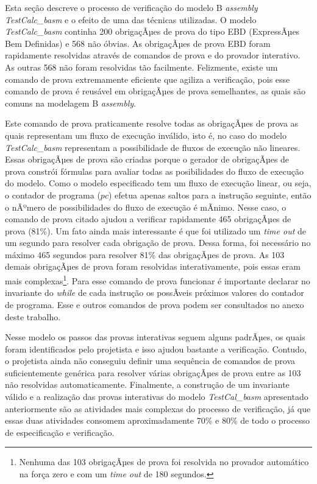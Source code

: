 \documentclass[11pt]{article} %
\begin{document}
Esta seção descreve o processo de verificação do modelo B \textit{assembly} \textit{TestCalc\_basm} e o
efeito de uma das técnicas utilizadas. O modelo \textit{TestCalc\_basm} continha 200 obrigaçÃµes de prova
do tipo EBD (ExpressÃµes Bem Definidas) e 568 não óbvias. As obrigaçÃµes de prova EBD foram rapidamente
resolvidas através de comandos de prova e do provador interativo. As outras 568 não foram resolvidas tão
facilmente. Felizmente, existe um comando de prova extremamente eficiente que agiliza a verificação, pois
esse comando de prova é reusável em obrigaçÃµes de prova semelhantes, as quais são comuns na modelagem B
\textit{assembly}.

Este comando de prova praticamente resolve todas as obrigaçÃµes de prova as quais representam um fluxo de
execução inválido, isto é, no caso do modelo \textit{TestCalc\_basm} representam a possibilidade de
fluxos de execução não lineares. Essas obrigaçÃµes de prova são criadas porque o gerador de obrigaçÃµes de prova constrói fórmulas para avaliar todas as posibilidades
do fluxo de execução do modelo. Como o modelo especificado tem um fluxo de execução linear, ou
seja, o contador de programa ($\mathit{pc}$) efetua apenas saltos para a instrução seguinte, então o nÃºmero
de possibilidades do fluxo de execução é mÃ­nimo. Nesse caso, o comando de prova citado ajudou a verificar
rapidamente 465 obrigaçÃµes de prova (81\%). Um fato ainda mais interessante é que foi utilizado um \textit{time out}
de um segundo para resolver cada obrigação de prova. Dessa forma, foi necessário no máximo 465 segundos para resolver 81\%
das obrigaçÃµes de prova. As 103 demais obrigaçÃµes de prova foram resolvidas interativamente, pois essas eram mais
complexas\footnote{Nenhuma das 103 obrigaçÃµes de prova foi resolvida no provador automático na força
zero e com um \textit{time out} de 180 segundos.}. Para esse comando de prova funcionar é
importante declarar no invariante do \textit{while} de cada instrução os possÃ­veis próximos valores do
contador de programa. Esse e outros comandos de prova podem ser consultados no anexo deste trabalho.

Nesse modelo os passos das provas interativas seguem alguns padrÃµes, os quais foram identificados pelo projetista
e isso ajudou bastante a verificação. Contudo, o projetista ainda não conseguiu definir uma sequência de comandos de prova 
suficientemente genérica para resolver várias obrigaçÃµes de prova entre as 103 não resolvidas
automaticamente. Finalmente, a construção de um invariante válido e a realização das provas interativas
do modelo \textit{TestCal\_basm} apresentado anteriormente são as atividades mais complexas do processo
de verificação, já que essas duas atividades consomem aproximadamente 70\% e 80\% de todo o processo de especificação e
 verificação.
\end{document}
